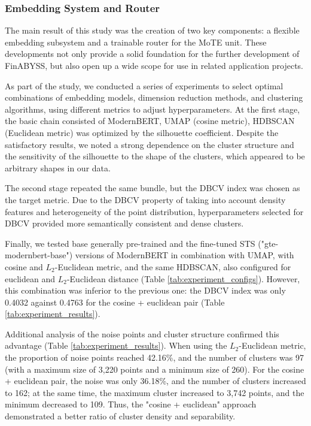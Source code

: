 \subsubsection{Embedding System and Router}
\label{sec:emb_sys_and_router}
The main result of this study was the creation of two key components: a flexible embedding
subsystem and a trainable router for the MoTE unit. These developments not only provide
a solid foundation for the further development of FinABYSS, but also open up a wide scope
for use in related application projects.

As part of the study, we conducted a series of experiments to select optimal combinations
of embedding models, dimension reduction methods, and clustering algorithms, using different
metrics to adjust hyperparameters. At the first stage, the basic chain consisted of ModernBERT,
UMAP (cosine metric), HDBSCAN (Euclidean metric) was optimized by the silhouette coefficient.
Despite the satisfactory results, we noted a strong dependence on the cluster structure and
the sensitivity of the silhouette to the shape of the clusters, which appeared to be arbitrary
shapes in our data.

The second stage repeated the same bundle, but the DBCV index was chosen as the target metric. Due
to the DBCV property of taking into account density features and heterogeneity of the point
distribution, hyperparameters selected for DBCV provided more semantically consistent and dense
clusters.

Finally, we tested base generally pre-trained \parencite{Warner2024ModernBERT} and
the fine-tuned STS ("gte-modernbert-base") versions of ModernBERT \parencite{MGTE2024}
in combination with UMAP, with cosine and $L_2$-Euclidean metric, and the same HDBSCAN,
also configured for euclidean and $L_2$-Euclidean distance (Table \ref{tab:experiment_configs}).
However, this combination was inferior to the previous one: the DBCV index was only 0.4032
against 0.4763 for the cosine + euclidean pair (Table \ref{tab:experiment_results}).



Additional analysis of the noise points and cluster structure confirmed this advantage
(Table \ref{tab:experiment_results}). When using the $L_2$-Euclidean metric, the proportion
of noise points reached 42.16\%, and the number of clusters was 97 (with a maximum size
of 3,220 points and a minimum size of 260). For the cosine + euclidean pair, the noise was
only 36.18\%, and the number of clusters increased to 162; at the same time, the maximum
cluster increased to 3,742 points, and the minimum decreased to 109. Thus, the "cosine +
euclidean" approach demonstrated a better ratio of cluster density and separability.

